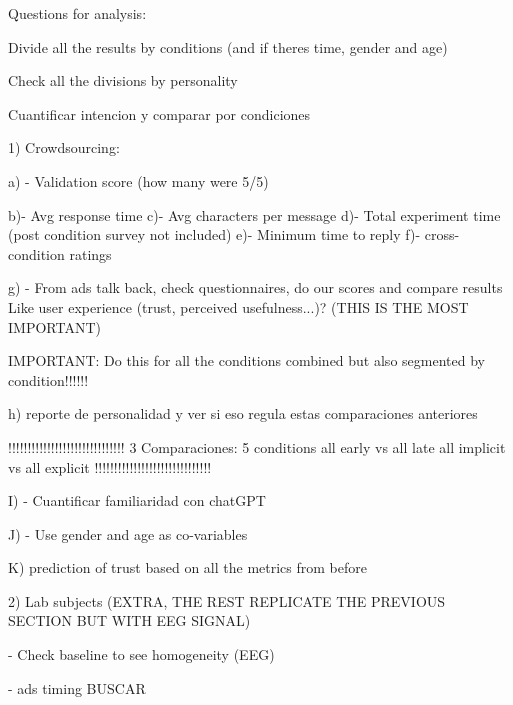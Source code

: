 Questions for analysis:


Divide all the results by conditions (and if theres time, gender and age)

Check all the divisions by personality

Cuantificar intencion y comparar por condiciones

1) Crowdsourcing:

a) - Validation score (how many were 5/5)

b)- Avg response time
c)- Avg characters per message
d)- Total experiment time (post condition survey not included)
e)- Minimum time to reply 
f)- cross-condition ratings

g) - From ads talk back, check questionnaires, do our scores and compare results
Like user experience (trust, perceived usefulness...)? (THIS IS THE MOST IMPORTANT)


IMPORTANT: Do this for all the conditions combined but also segmented by condition!!!!!!

h) reporte de personalidad y ver si eso regula estas comparaciones anteriores

!!!!!!!!!!!!!!!!!!!!!!!!!!!!!!
3 Comparaciones: 5 conditions
all early vs all late
all implicit vs all explicit
!!!!!!!!!!!!!!!!!!!!!!!!!!!!!!


I) - Cuantificar familiaridad con chatGPT

J) - Use gender and age as co-variables

K) prediction of trust based on all the metrics from before

2) Lab subjects (EXTRA, THE REST REPLICATE THE PREVIOUS SECTION BUT WITH EEG SIGNAL)

- Check baseline to see homogeneity (EEG)



- ads timing BUSCAR

